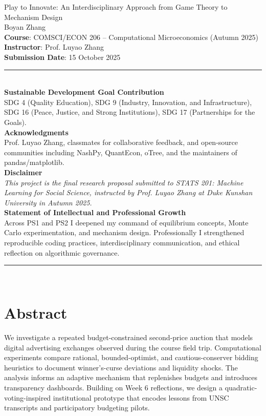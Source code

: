 \documentclass[11pt]{article}
\begin{document}
\begin{titlepage}
  \centering
  {\LARGE Play to Innovate: An Interdisciplinary Approach from Game Theory to Mechanism Design\\[1.5ex]}
  {\large Boyan Zhang\\}
  \vspace{1.5em}
  \textbf{Course}: COMSCI/ECON 206 -- Computational Microeconomics (Autumn 2025)\\
  \textbf{Instructor}: Prof. Luyao Zhang\\
  \textbf{Submission Date}: 15 October 2025\\[1.5ex]
  \rule{\linewidth}{0.4pt}\\[1ex]
  \textbf{Sustainable Development Goal Contribution}\\[0.5ex]
  SDG 4 (Quality Education), SDG 9 (Industry, Innovation, and Infrastructure), SDG 16 (Peace, Justice, and Strong Institutions), SDG 17 (Partnerships for the Goals).\\[1ex]
  \textbf{Acknowledgments}\\[0.5ex]
  Prof. Luyao Zhang, classmates for collaborative feedback, and open-source communities including NashPy, QuantEcon, oTree, and the maintainers of pandas/matplotlib.\\[1ex]
  \textbf{Disclaimer}\\[0.5ex]
  \emph{This project is the final research proposal submitted to STATS 201: Machine Learning for Social Science, instructed by Prof. Luyao Zhang at Duke Kunshan University in Autumn 2025.}\\[1ex]
  \textbf{Statement of Intellectual and Professional Growth}\\[0.5ex]
  Across PS1 and PS2 I deepened my command of equilibrium concepts, Monte Carlo experimentation, and mechanism design. Professionally I strengthened reproducible coding practices, interdisciplinary communication, and ethical reflection on algorithmic governance.\\[2ex]
  \rule{\linewidth}{0.4pt}\\[2ex]
\end{titlepage}

\tableofcontents
\newpage

\section{Abstract}
We investigate a repeated budget-constrained second-price auction that models digital advertising exchanges observed during the course field trip. Computational experiments compare rational, bounded-optimist, and cautious-conserver bidding heuristics to document winner's-curse deviations and liquidity shocks. The analysis informs an adaptive mechanism that replenishes budgets and introduces transparency dashboards. Building on Week 6 reflections, we design a quadratic-voting-inspired institutional prototype that encodes lessons from UNSC transcripts and participatory budgeting pilots.
\end{document}
